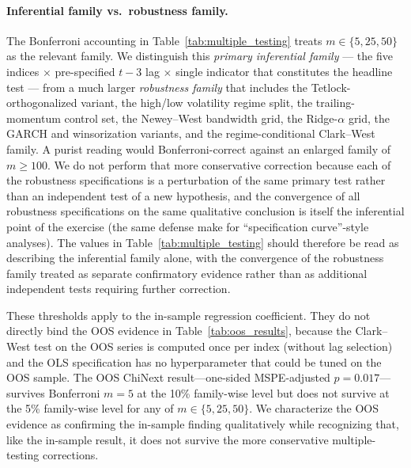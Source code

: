 \documentclass[AER]{AEA}
\begin{document}
\paragraph{Inferential family vs.\ robustness family.} The Bonferroni accounting in Table~\ref{tab:multiple_testing} treats $m \in \{5, 25, 50\}$ as the relevant family. We distinguish this \emph{primary inferential family} --- the five indices $\times$ pre-specified $t-3$ lag $\times$ single indicator that constitutes the headline test --- from a much larger \emph{robustness family} that includes the Tetlock-orthogonalized variant, the high/low volatility regime split, the trailing-momentum control set, the Newey--West bandwidth grid, the Ridge-$\alpha$ grid, the GARCH and winsorization variants, and the regime-conditional Clark--West family. A purist reading would Bonferroni-correct against an enlarged family of $m \geq 100$. We do not perform that more conservative correction because each of the robustness specifications is a perturbation of the same primary test rather than an independent test of a new hypothesis, and the convergence of all robustness specifications on the same qualitative conclusion is itself the inferential point of the exercise (the same defense \citet{harvey2016cross} make for ``specification curve''-style analyses). The values in Table~\ref{tab:multiple_testing} should therefore be read as describing the inferential family alone, with the convergence of the robustness family treated as separate confirmatory evidence rather than as additional independent tests requiring further correction.

These thresholds apply to the in-sample regression coefficient. They do not directly bind the OOS evidence in Table~\ref{tab:oos_results}, because the Clark--West test on the OOS series is computed once per index (without lag selection) and the OLS specification has no hyperparameter that could be tuned on the OOS sample. The OOS ChiNext result---one-sided MSPE-adjusted $p = 0.017$---survives Bonferroni $m=5$ at the 10\% family-wise level but does not survive at the 5\% family-wise level for any of $m \in \{5, 25, 50\}$. We characterize the OOS evidence as confirming the in-sample finding qualitatively while recognizing that, like the in-sample result, it does not survive the more conservative multiple-testing corrections.





\end{document}

